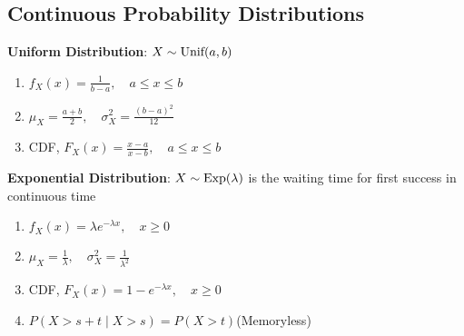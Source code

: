 \documentclass[12pt, a4paper]{article}
\begin{document}
\begin{multicols*}{3}
\section{Continuous Probability Distributions}
\textbf{Uniform Distribution}: $X \sim \text{Unif}(a, b)$
\begin{enumerate}[\roman*.]
  \item $ f_X(x) = \frac{1}{b - a},\quad a \leq x \leq b $
  \item $ \mu_X = \frac{a + b}{2},\quad \sigma^2_X = \frac{(b - a)^2}{12} $
  \item CDF, $F_X(x) = \frac{x-a}{x-b},\quad a\leq x\leq b$
\end{enumerate}

\textbf{Exponential Distribution}: $ X \sim \text{Exp}(\lambda)$ is the waiting time for first success in continuous time
\begin{enumerate}[\roman*.]
  \item $ f_X(x) = \lambda e^{-\lambda x},\quad x \geq 0 $
  \item $ \mu_X = \frac{1}{\lambda},\quad \sigma^2_X = \frac{1}{\lambda^2} $
  \item CDF, $F_X(x) = 1-e^{-\lambda x},\quad x\geq 0$
  \item $P(X>s+t\mid X>s) = P(X>t)$\hfill(Memoryless)
\end{enumerate}


\end{multicols*}
\end{document}
